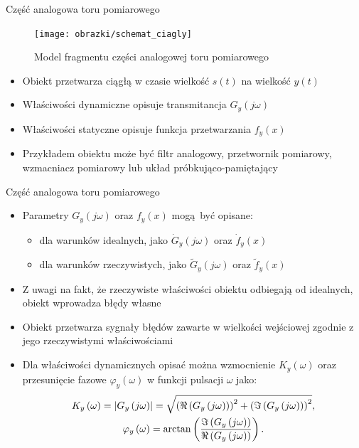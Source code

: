 \documentclass[12pt, polish, aspectratio = 169]{beamer}
\begin{document}
\begin{frame}{Część analogowa toru pomiarowego}
\begin{figure}
\texttt{[image: obrazki/schemat\_ciagly]}
\caption{Model fragmentu części analogowej toru pomiarowego}
\end{figure}
\begin{itemize}
\item Obiekt przetwarza ciągłą w czasie wielkość $s(t)$ na wielkość $y(t)$
\item Właściwości dynamiczne opisuje transmitancja $G_{y}(j\omega)$
\item Właściwości statyczne opisuje funkcja przetwarzania $f_{y}(x)$
\item Przykładem obiektu może być filtr analogowy, przetwornik pomiarowy, wzmacniacz pomiarowy lub układ próbkująco-pamiętający
\end{itemize}
\end{frame}

\begin{frame}{Część analogowa toru pomiarowego}
\begin{itemize}
\item Parametry $G_{y}(j\omega)$ oraz $f_{y}(x)$ mogą być opisane:
	\begin{itemize}
	\item dla warunków idealnych, jako $\dot{G}_{y}(j\omega)$ oraz $\dot{f}_{y}(x)$
	\item dla warunków rzeczywistych, jako $\tilde{G}_{y}(j\omega)$ oraz $\tilde{f}_{y}(x)$
	\end{itemize}
\item Z uwagi na fakt, że rzeczywiste właściwości obiektu odbiegają od idealnych, obiekt wprowadza błędy własne
\item Obiekt przetwarza sygnały błędów zawarte w wielkości wejściowej zgodnie z jego rzeczywistymi właściwościami
\item Dla właściwości dynamicznych opisać można wzmocnienie $K_{y}(\omega)$ oraz przesunięcie fazowe $\varphi_{y}(\omega)$ w funkcji pulsacji $\omega$ jako:
\begin{gather}
K_{y} \left(\omega\right) = \left| G_{y} \left(j\omega\right) \right| =
	\sqrt{\left( \Re \left( G_{y} \left(j\omega\right) \right) \right)^{2} +
	\left( \Im \left( G_{y} \left(j\omega\right) \right) \right)^{2}}
\label{eq:mid_cont_amp}, \\
\varphi_{y} \left(\omega\right) = \arctan \left( \frac{\Im \left( G_{y} \left(j\omega\right) \right)}{\Re \left( G_{y} \left(j\omega\right) \right)} \right) \label{eq:mid_cont_phi}.
\end{gather}
\end{itemize}
\end{frame}
\end{document}
